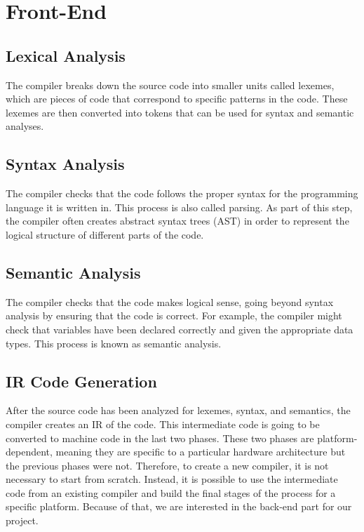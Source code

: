 \section{Front-End}

\subsection{Lexical Analysis}
The compiler breaks down the source code into smaller units called lexemes, which are pieces of code that correspond to specific patterns in the code. These lexemes are then converted into tokens that can be used for syntax and semantic analyses.

\subsection{Syntax Analysis}
The compiler checks that the code follows the proper syntax for the programming language it is written in. This process is also called parsing. As part of this step, the compiler often creates abstract syntax trees (AST) in order to represent the logical structure of different parts of the code.

\subsection{Semantic Analysis}
The compiler checks that the code makes logical sense, going beyond syntax analysis by ensuring that the code is correct. For example, the compiler might check that variables have been declared correctly and given the appropriate data types. This process is known as semantic analysis.

\subsection{IR Code Generation}
After the source code has been analyzed for lexemes, syntax, and semantics, the compiler creates an IR of the code.
This intermediate code is going to be converted to machine code in the last two phases. These two phases are platform-dependent, meaning they are specific to a particular hardware architecture but the previous phases were not. Therefore, to create a new compiler, it is not necessary to start from scratch. Instead, it is possible to use the intermediate code from an existing compiler and build the final stages of the process for a specific platform. Because of that, we are interested in the back-end part for our project.

